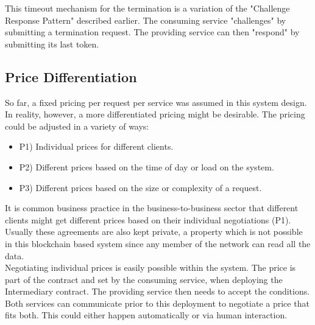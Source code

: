 \documentclass[a4paper,12pt]{scrartcl}
\begin{document}
This timeout mechanism for the termination is a variation of the "Challenge Response Pattern"  \cite{eberhardt2017or} described earlier. The consuming service "challenges" by submitting a termination request. The providing service can then "respond" by submitting its last token.\\

\subsection{Price Differentiation}

So far, a fixed pricing per request per service was assumed in this system design. In reality, however, a more differentiated pricing might be desirable. The pricing could be adjusted in a variety of ways:

\begin{itemize}
\item[] P1) Individual prices for different clients.
\item[] P2) Different prices based on the time of day or load on the system.
\item[] P3) Different prices based on the size or complexity of a request.
\end{itemize}

It is common business practice in the business-to-business sector that different clients might get different prices based on their individual negotiations (P1). Usually these agreements are also kept private, a property which is not possible in this blockchain based system since any member of the network can read all the data.\\
Negotiating individual prices is easily possible within the system. The price is part of the contract and set by the consuming service, when deploying the Intermediary contract. The providing service then needs to accept the conditions. Both services can communicate prior to this deployment to negotiate a price that fits both. This could either happen automatically or via human interaction.\\
\end{document}
